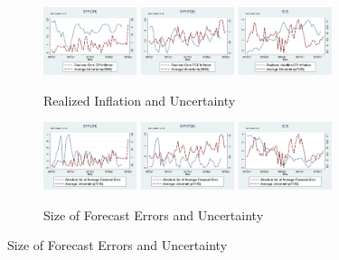 \documentclass[12pt]{article}
\begin{document}
	
	\begin{figure}[p]
		\centering
		\begin{subfigure}[b]{\textwidth}
			\centering
			\caption{Realized Inflation and Uncertainty}
			\label{InfVar}
			\includegraphics[width=0.3\textwidth]{figures/Inf1yf_CPICore_varSPFCPIQ.png}
			\includegraphics[width=0.3\textwidth]{figures/Inf1yf_PCECore_varSPFPCEQ.png}
			\includegraphics[width=0.3\textwidth]{figures/Inf1yf_CPIAU_varSCEM.png}
		\end{subfigure}
	    \vspace{1em}
		\vfill
		\begin{subfigure}[b]{\textwidth}
			\centering
			\caption{Size of Forecast Errors and Uncertainty}
			\label{FEVar}
			\includegraphics[width=0.3\textwidth]{figures/SPFCPI_abFE_varSPFCPIQ.png}
			\includegraphics[width=0.3\textwidth]{figures/SPFPCE_abFE_varSPFPCEQ.png}
			\includegraphics[width=0.3\textwidth]{figures/SCE_abFE_varSCEM.png}

\end{subfigure}
\end{figure}
\end{document}
